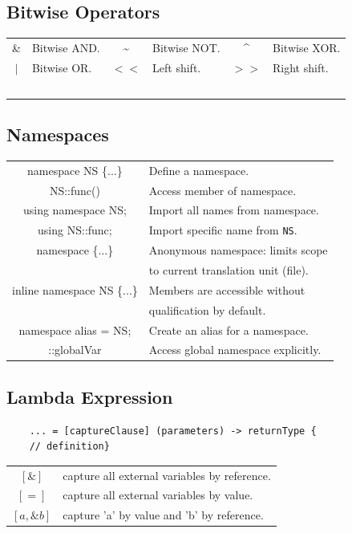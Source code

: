 \documentclass[5pt]{article}
\begin{document}
\begin{multicols}{2}
\subsection{Bitwise Operators}
\begin{tabular}{C L | C L |  C L }
\&           & Bitwise AND. & \textasciitilde  & Bitwise NOT. & \textasciicircum & Bitwise XOR.\\
$|$          & Bitwise OR. & $<<$         & Left shift. &  $>>$         & Right shift.\\\
\end{tabular}


\subsection{Namespaces}
\begin{tabular}{C L}
namespace NS \{...\}      & Define a namespace.\\
NS::func()                & Access member of namespace.\\
using namespace NS;       & Import all names from namespace.\\
using NS::func;           & Import specific name from \texttt{NS}.\\
namespace \{...\}           & Anonymous namespace: limits scope\\
                            & to current translation unit (file).\\
inline namespace NS \{...\} & Members are accessible without\\
                            & qualification by default.\\
namespace alias = NS;     & Create an alias for a namespace.\\
::globalVar                 & Access global namespace explicitly.\\
\end{tabular}

\subsection{Lambda Expression}
\begin{verbatim}
    ... = [captureClause] (parameters) -> returnType { 
    // definition}
\end{verbatim}
\begin{tabular}{C L}
    $[\&]$                  & capture all external variables by reference.\\
    $[=]$                   & capture all external variables by value.\\
    $[a, \&b]$              & capture 'a' by value and 'b' by reference.\\
\end{tabular}


\end{multicols}
\end{document}
